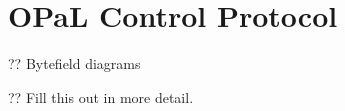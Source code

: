 \chapter{OPaL Control Protocol}
\label{adx:opal-proto}

?? Bytefield diagrams

?? Fill this out in more detail.
